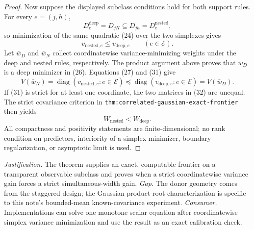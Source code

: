 \documentclass{article}
\begin{document}
\begin{proof}
Now suppose the displayed subclass conditions hold for both support rules.
For every \(e=(j,h)\),
\[
 D^{\mathrm{deep}}_e=D_{jK}\subseteq D_{jh}
 =D^{\mathrm{nested}}_e,
\]
so minimization of the same quadratic (24) over the two simplexes gives
\[
 v_{\mathrm{nested},e}\leq v_{\mathrm{deep},e}
 \qquad(e\in\mathcal E). \tag{31}
\]
Let \(\bar w_D\) and \(\bar w_N\) collect coordinatewise
variance-minimizing weights under the deep and nested rules, respectively.
The product argument above proves that \(\bar w_D\) is a deep minimizer in
(26).  Equations (27) and (31) give
\[
 V(\bar w_N)=\operatorname{diag}
   (v_{\mathrm{nested},e}:e\in\mathcal E)
 \preceq
 \operatorname{diag}
   (v_{\mathrm{deep},e}:e\in\mathcal E)
 =V(\bar w_D). \tag{32}
\]
If (31) is strict for at least one coordinate, the two matrices in (32) are
unequal.  The strict covariance criterion in
\texttt{thm:correlated-gaussian-exact-frontier} then yields
\[
 W_{\mathrm{nested}}<W_{\mathrm{deep}}. \tag{33}
\]
All compactness and positivity statements are finite-dimensional; no rank
condition on predictors, interiority of a simplex minimizer, boundary
regularization, or asymptotic limit is used.
\end{proof}
\par\smallskip\noindent \textit{Justification.} The theorem supplies an exact, computable frontier on a transparent observable subclass and proves when a strict coordinatewise variance gain forces a strict simultaneous-width gain. \textit{Gap.} The donor geometry comes from the staggered design; the Gaussian product-root characterization is specific to this note's bounded-mean known-covariance experiment. \textit{Consumer.} Implementations can solve one monotone scalar equation after coordinatewise simplex variance minimization and use the result as an exact calibration check.
\end{document}
